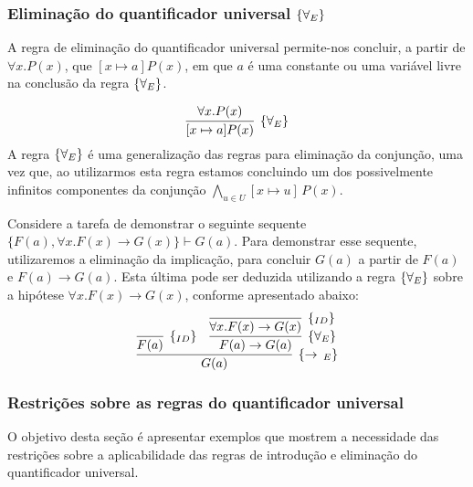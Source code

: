 \subsubsection{Eliminação do quantificador universal $\scriptsize{\{\forall_E}\}$}

A regra de eliminação do quantificador universal permite-nos concluir,
a partir de $\forall x. P(x)$, que $[x\mapsto a]P(x)$, em que $a$ é uma
constante ou uma variável livre na conclusão da regra $\scriptsize{\{\forall_E}\}$.

\[
\infer[\forallE]{[x\mapsto a]P(x)}
                      {\forall x. P(x)}
\]
A regra $\scriptsize{\{\forall_E}\}$ é uma generalização das regras para eliminação da
conjunção, uma vez que, ao utilizarmos esta regra estamos concluindo
um dos possivelmente infinitos componentes da conjunção
$\bigwedge_{u\in U}[x\mapsto u]\,P(x)$.
\begin{Example}
Considere a tarefa de demonstrar o seguinte sequente $\{F(a),\forall
x. F(x) \to G(x)\} \vdash G(a)$. Para demonstrar esse sequente,
utilizaremos a eliminação da implicação, para concluir $G(a)$ a partir
de $F(a)$ e $F(a) \to G(a)$. Esta última pode ser deduzida utilizando
a regra $\scriptsize{\{\forall_E}\}$ sobre a hipótese $\forall x. F(x) \to G(x)$,
conforme apresentado abaixo:
\[
\infer[\impE]{G(a)}
        {\infer[\Id]{F(a)}{} &
         \infer[\forallE]{F(a) \to G(a)} {
           \infer[\Id]{\forall x. F(x)\to G(x)}{}
                  }}
\]
\end{Example}

\subsubsection{Restrições sobre as regras do quantificador universal}

O objetivo desta seção é apresentar exemplos que mostrem a necessidade
das restrições sobre a aplicabilidade das regras de introdução e
eliminação do quantificador universal.

